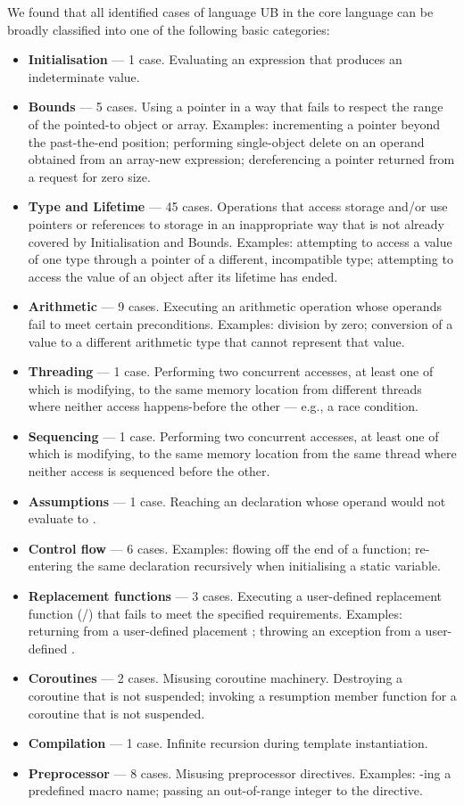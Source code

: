 We found that all identified cases of language UB in the core language can be broadly classified into one of the following basic categories:
\begin{itemize}
\item \textbf{Initialisation} --- 1 case. Evaluating an expression that produces an indeterminate value.
\item \textbf{Bounds} --- 5 cases. Using a pointer in a way that fails to respect the range of the pointed-to object or array. Examples: incrementing a pointer beyond the past-the-end position; performing single-object delete on an operand obtained from an array-new expression;  dereferencing a pointer returned from a request for zero size.
\item \textbf{Type and Lifetime} --- 45 cases. Operations that access storage and/or use pointers or references to storage in an inappropriate way that is not already covered by Initialisation and Bounds. Examples: attempting to access a value of one type through  a pointer of a different, incompatible type; attempting to access the value of an object after its lifetime has ended. 
\item \textbf{Arithmetic} --- 9 cases. Executing an arithmetic operation whose operands fail to meet certain preconditions. Examples: division by zero; conversion of a value to a different arithmetic type that cannot represent that value. 
\item \textbf{Threading} --- 1 case. Performing two concurrent accesses, at least one of which is modifying, to the same memory location from different threads where neither access happens-before the other --- e.g., a race condition.
\item \textbf{Sequencing} --- 1 case. Performing two concurrent accesses, at least one of which is modifying, to the same memory location from the same thread where neither access is sequenced before the other.
\item \textbf{Assumptions} --- 1 case. Reaching an \tcode{[[assume]]} declaration whose operand would not evaluate to .
\item \textbf{Control flow} --- 6 cases. Examples: flowing off the end of a function; re-entering the same declaration recursively when initialising a static variable.
\item \textbf{Replacement functions} --- 3 cases. Executing a user-defined replacement function (/) that fails to meet the specified requirements. Examples: returning  from a user-defined placement ; throwing an exception from a user-defined .
\item \textbf{Coroutines} --- 2 cases. Misusing coroutine machinery. Destroying a coroutine that is not suspended; invoking a resumption member function for a coroutine that is not suspended.
\item \textbf{Compilation} --- 1 case. Infinite recursion during template instantiation.
\item \textbf{Preprocessor} --- 8 cases. Misusing preprocessor directives. Examples: -ing a predefined macro name; passing an out-of-range integer to the  directive.
\end{itemize}

